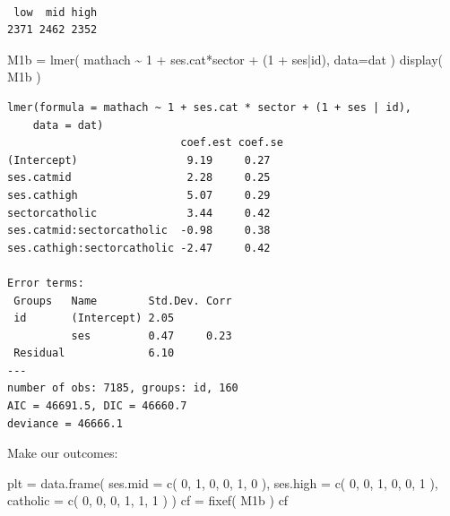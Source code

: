 \documentclass[
  letterpaper,
  DIV=11,
  numbers=noendperiod]{scrreprt}
\newenvironment{Shaded}{\begin{snugshade}}{\end{snugshade}}
\newcommand{\AttributeTok}[1]{\textcolor[rgb]{0.49,0.56,0.16}{#1}}
\newcommand{\DecValTok}[1]{\textcolor[rgb]{0.25,0.63,0.44}{#1}}
\newcommand{\FunctionTok}[1]{\textcolor[rgb]{0.02,0.16,0.49}{#1}}
\newcommand{\NormalTok}[1]{\textcolor[rgb]{0.00,0.44,0.13}{#1}}
\newcommand{\OtherTok}[1]{\textcolor[rgb]{0.00,0.44,0.13}{#1}}
\newcommand{\SpecialCharTok}[1]{\textcolor[rgb]{0.25,0.44,0.63}{#1}}
\begin{document}
\begin{verbatim}

 low  mid high 
2371 2462 2352 
\end{verbatim}

\begin{Shaded}
\begin{Highlighting}[]
\NormalTok{M1b }\OtherTok{=} \FunctionTok{lmer}\NormalTok{( mathach }\SpecialCharTok{\textasciitilde{}} \DecValTok{1} \SpecialCharTok{+}\NormalTok{ ses.cat}\SpecialCharTok{*}\NormalTok{sector }\SpecialCharTok{+}\NormalTok{ (}\DecValTok{1} \SpecialCharTok{+}\NormalTok{ ses}\SpecialCharTok{|}\NormalTok{id), }\AttributeTok{data=}\NormalTok{dat )}
\FunctionTok{display}\NormalTok{( M1b )}
\end{Highlighting}
\end{Shaded}

\begin{verbatim}
lmer(formula = mathach ~ 1 + ses.cat * sector + (1 + ses | id), 
    data = dat)
                           coef.est coef.se
(Intercept)                 9.19     0.27  
ses.catmid                  2.28     0.25  
ses.cathigh                 5.07     0.29  
sectorcatholic              3.44     0.42  
ses.catmid:sectorcatholic  -0.98     0.38  
ses.cathigh:sectorcatholic -2.47     0.42  

Error terms:
 Groups   Name        Std.Dev. Corr 
 id       (Intercept) 2.05          
          ses         0.47     0.23 
 Residual             6.10          
---
number of obs: 7185, groups: id, 160
AIC = 46691.5, DIC = 46660.7
deviance = 46666.1 
\end{verbatim}

Make our outcomes:

\begin{Shaded}
\begin{Highlighting}[]
\NormalTok{plt }\OtherTok{=} \FunctionTok{data.frame}\NormalTok{( }\AttributeTok{ses.mid =} \FunctionTok{c}\NormalTok{( }\DecValTok{0}\NormalTok{, }\DecValTok{1}\NormalTok{, }\DecValTok{0}\NormalTok{, }\DecValTok{0}\NormalTok{, }\DecValTok{1}\NormalTok{, }\DecValTok{0}\NormalTok{ ),}
                  \AttributeTok{ses.high =} \FunctionTok{c}\NormalTok{( }\DecValTok{0}\NormalTok{, }\DecValTok{0}\NormalTok{, }\DecValTok{1}\NormalTok{, }\DecValTok{0}\NormalTok{, }\DecValTok{0}\NormalTok{, }\DecValTok{1}\NormalTok{ ),}
                  \AttributeTok{catholic =} \FunctionTok{c}\NormalTok{( }\DecValTok{0}\NormalTok{, }\DecValTok{0}\NormalTok{, }\DecValTok{0}\NormalTok{, }\DecValTok{1}\NormalTok{, }\DecValTok{1}\NormalTok{, }\DecValTok{1}\NormalTok{ ) )}
\NormalTok{cf }\OtherTok{=} \FunctionTok{fixef}\NormalTok{( M1b )}
\NormalTok{cf}
\end{Highlighting}
\end{Shaded}
\end{document}
